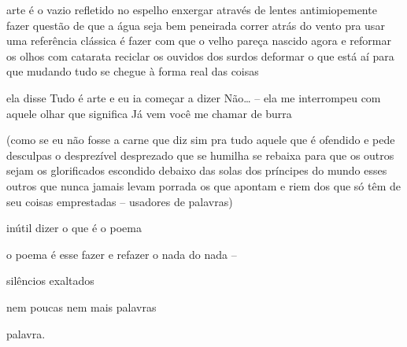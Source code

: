 \begin{poem}
\begin{stanza}
arte é o vazio refletido no espelho\verseline
enxergar através de lentes\verseline
antimiopemente \qquad fazer questão\verseline
de que a água seja bem peneirada\verseline
correr atrás do vento \qquad pra usar\verseline
uma referência clássica\verseline
é fazer com que o velho\verseline
pareça nascido agora\verseline
e reformar os olhos com catarata\verseline
reciclar os ouvidos dos surdos\verseline
deformar o que está aí\verseline
para que mudando tudo\verseline
se chegue à forma real das coisas
\end{stanza}
\begin{stanza}
ela disse\verseline
\qquad Tudo é arte\verseline
\qquad \qquad e eu ia começar a dizer\verseline
\qquad Não…\verseline
– ela me interrompeu com aquele olhar\verseline
que significa\verseline
\qquad Já vem você me chamar de burra
\end{stanza}
\begin{stanza}
\qquad (como se eu não fosse a carne\verseline
\qquad que diz sim pra tudo\verseline
\qquad aquele que é ofendido\verseline
\qquad e pede desculpas\verseline
\qquad o desprezível desprezado\verseline
\qquad que se humilha se rebaixa\verseline
\qquad para que os outros sejam\verseline
\qquad os glorificados\verseline
\qquad escondido debaixo\verseline
\qquad das solas dos príncipes\verseline
\qquad do mundo\verseline
\qquad esses outros que nunca\verseline
\qquad jamais levam porrada\verseline
\qquad os que apontam e riem\verseline
\qquad dos que só têm de seu\verseline
\qquad coisas emprestadas\verseline
\qquad – usadores de palavras)
\end{stanza}
\begin{stanza}
inútil dizer o que é o poema
\end{stanza}
\begin{stanza}
\qquad o poema é esse fazer e refazer o nada\verseline
\qquad \qquad \qquad \qquad do nada – 
\end{stanza}
\begin{stanza}
silêncios exaltados
\end{stanza}
\begin{stanza}
nem poucas nem mais palavras
\end{stanza}
\begin{stanza}
palavra.
\end{stanza}
\begin{stanza}

\end{stanza}
\end{poem}
